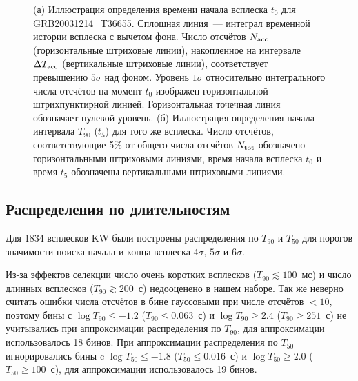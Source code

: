 \begin{figure}[h]
  \begin{minipage}[h]{0.5\textwidth}
  \end{minipage}
  \hfill
  \begin{minipage}[h]{0.5\textwidth}
  \end{minipage}  
  \caption{
  (а) Иллюстрация определения времени начала всплеска $t_0$ для GRB20031214\_T36655. 
  Сплошная линия~--- интеграл временной истории всплеска с вычетом фона. 
  Число отсчётов $N_{\mathrm{acc}}$ (горизонтальные штриховые линии), 
  накопленное на интервале $\Delta T_{\mathrm{acc}}$ (вертикальные штриховые линии), 
  соответствует превышению $5\sigma$ над фоном. Уровень $1\sigma$ относительно интегрального 
  числа отсчётов на момент $t_0$  изображен горизонтальной штрихпунктирной линией. 
  Горизонтальная точечная линия обозначает нулевой уровень.
  (б) Иллюстрация определения начала интервала $T_{90}$ ($t_5$) для того же всплеска.
  Число отсчётов, соответствующие 5\% от общего числа отсчётов $N_{\mathrm{tot}}$ 
  обозначено горизонтальными штриховыми линиями, время начала всплеска $t_0$ и время $t_5$ 
  обозначены вертикальными штриховыми линиями. \label{fig:T100_calculation} }
\end{figure}

\subsection{Распределения по длительностям}
Для 1834 всплесков KW были построены распределения по $T_{90}$ и $T_{50}$ 
для порогов значимости поиска начала и конца всплеска $4\sigma$, $5\sigma$ и $6\sigma$. 

Из-за эффектов селекции число очень коротких всплесков ($T_{90} \lesssim 100$~мс) и 
число длинных всплесков ($T_{90} \gtrsim 200$~с) недооценено в нашем наборе. Так же неверно 
считать ошибки числа отсчётов в бине гауссовыми при числе отсчётов $<10$, поэтому 
бины с $\log T_{90} \leq -1.2$ ($T_{90} \leq 0.063$~с) и $\log T_{90} \geq 2.4$ ($T_{90} \geq 251$~с) 
не учитывались при аппроксимации распределения по $T_{90}$,  для аппроксимации 
использовалось 18 бинов. При аппроксимации распределения по $T_{50}$ игнорировались 
бины c $\log T_{50} \leq -1.8$ ($T_{50} \leq 0.016$~с) и  $\log T_{50} \geq 2.0$ 
($T_{50} \geq 100$~с), для аппроксимации использовалось 19 бинов.

